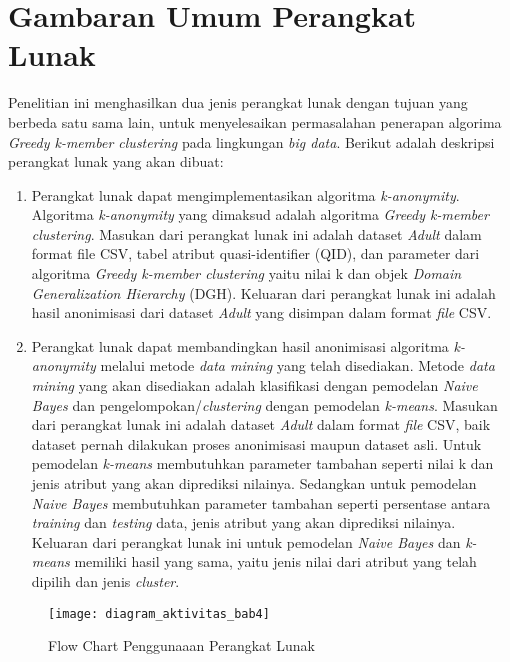 \section{Gambaran Umum Perangkat Lunak}
Penelitian ini menghasilkan dua jenis perangkat lunak dengan tujuan yang berbeda satu sama lain, untuk menyelesaikan permasalahan penerapan algorima \textit{Greedy k-member clustering} pada lingkungan \textit{big data}. Berikut adalah deskripsi perangkat lunak yang akan dibuat:

\begin{enumerate}

\item Perangkat lunak dapat mengimplementasikan algoritma \textit{k-anonymity}. Algoritma \textit{k-anonymity} yang dimaksud adalah algoritma \textit{Greedy k-member clustering}. Masukan dari perangkat lunak ini adalah dataset \textit{Adult} dalam format file CSV, tabel atribut quasi-identifier (QID), dan parameter dari algoritma \textit{Greedy k-member clustering} yaitu nilai k dan objek \textit{Domain Generalization Hierarchy} (DGH). Keluaran dari perangkat lunak ini adalah hasil anonimisasi dari dataset \textit{Adult} yang disimpan dalam format \textit{file} CSV.

\item Perangkat lunak dapat membandingkan hasil anonimisasi algoritma \textit{k-anonymity} melalui metode \textit{data mining} yang telah disediakan. Metode \textit{data mining} yang akan disediakan adalah klasifikasi dengan pemodelan \textit{Naive Bayes} dan pengelompokan/\textit{clustering} dengan pemodelan \textit{k-means}. Masukan dari perangkat lunak ini adalah dataset \textit{Adult} dalam format \textit{file} CSV, baik dataset pernah dilakukan proses anonimisasi maupun dataset asli. Untuk pemodelan \textit{k-means} membutuhkan parameter tambahan seperti nilai k dan jenis atribut yang akan diprediksi nilainya. Sedangkan untuk pemodelan \textit{Naive Bayes} membutuhkan parameter tambahan seperti persentase antara \textit{training} dan \textit{testing} data, jenis atribut yang akan diprediksi nilainya. Keluaran dari perangkat lunak ini untuk pemodelan \textit{Naive Bayes} dan \textit{k-means} memiliki hasil yang sama, yaitu jenis nilai dari atribut yang telah dipilih dan jenis \textit{cluster}.

\end{enumerate}

\begin{figure}[H]
	\centering
	\texttt{[image: diagram\_aktivitas\_bab4]}
	\caption{Flow Chart Penggunaaan Perangkat Lunak}
	\label{fig:diagram_aktivitas_bab4}
\end{figure}


